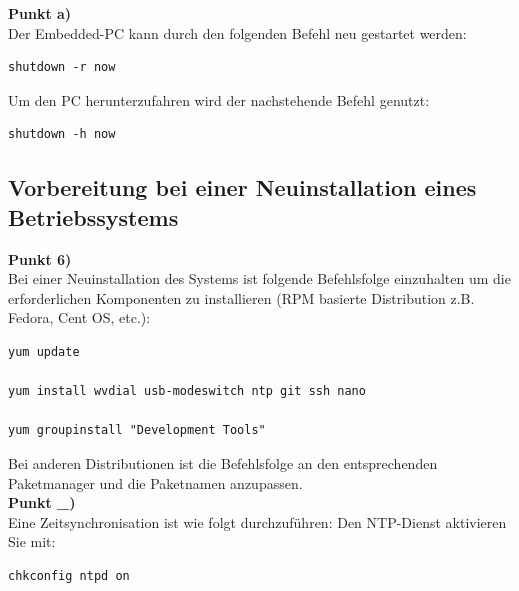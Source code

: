 \documentclass[fontsize = 12pt, paper = a4]{scrreprt}
\begin{document}
\textbf{Punkt a)} \\
	
Der Embedded-PC kann durch den folgenden Befehl neu gestartet werden:

\vspace*{4mm}
\begin{lstlisting}[frame=single]
shutdown -r now
\end{lstlisting} 
\vspace*{-2mm}

Um den PC herunterzufahren wird der nachstehende Befehl genutzt:

\vspace*{4mm}
\begin{lstlisting}[frame=single]
shutdown -h now	
\end{lstlisting} 
\vspace*{-2mm}

\newpage

\subsection{Vorbereitung bei einer Neuinstallation eines Betriebssystems}

\textbf{Punkt 6)} \\

Bei einer Neuinstallation des Systems ist folgende Befehlsfolge einzuhalten um die erforderlichen Komponenten zu installieren (RPM basierte Distribution z.B. Fedora, Cent OS, etc.):

\vspace*{4mm}
\begin{lstlisting}[frame=single]
yum update

yum install wvdial usb-modeswitch ntp git ssh nano

yum groupinstall "Development Tools"
\end{lstlisting} 
\vspace*{-2mm}

Bei anderen Distributionen ist die Befehlsfolge an den entsprechenden Paketmanager und die Paketnamen anzupassen. \\

\textbf{Punkt \_)} \\

Eine Zeitsynchronisation ist wie folgt durchzuführen:
Den NTP-Dienst aktivieren Sie mit: 

\vspace*{4mm}
\begin{lstlisting}[frame=single]
chkconfig ntpd on
\end{lstlisting} 
\vspace*{-2mm}
\end{document}
